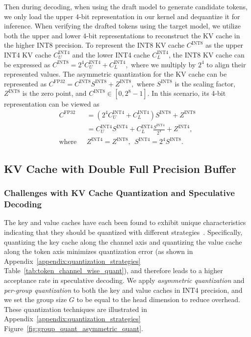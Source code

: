 Then during decoding, when using the draft model to generate candidate tokens, we only load the upper 4-bit representation in our kernel and dequantize it for inference. When verifying the drafted tokens using the target model, we utilize both the upper and lower 4-bit representations to reconstruct the KV cache in the higher INT8 precision. To represent the INT8 KV cache $C^{\text{INT8}}$ as the upper INT4 KV cache $C_{U}^{\text{INT4}}$ and the lower INT4 cache $C_{L}^{\text{INT4}}$, the INT8 KV cache can be expressed as $C^{\text{INT8}} = 2^4 C_{U}^{\text{INT4}} + C_{L}^{\text{INT4}},$ where we multiply by $2^4$ to align their represented values. The asymmetric quantization for the KV cache can be represented as
$C^{\text{FP32}} = C^{\text{INT8}} S^{\text{INT8}} + Z^{\text{INT8}},$
where $S^{\text{INT8}}$ is the scaling factor, $Z^{\text{INT8}}$ is the zero point, and $C^{\text{INT8}} \in [0, 2^8 - 1]$.
In this scenario, its 4-bit representation can be viewed as
\begin{align*}
    C^{\text{FP32}} &= (2^4 C_{U}^{\text{INT4}} + C_{L}^{\text{INT4}}) S^{\text{INT8}} + Z^{\text{INT8}} \\
    &= C_{U}^{\text{INT4}} S^{\text{INT4}} + C_{L}^{\text{INT4}} \frac{S^{\text{INT4}}}{2^4} + Z^{\text{INT4}}, \\
    \text{where~~} & Z^{\text{INT4}} = Z^{\text{INT8}}, ~~S^{\text{INT4}} = 2^4 S^{\text{INT8}}.
\end{align*}



\subsection{KV Cache with Double Full Precision Buffer}\label{subsec:full_precision_buffer}
\subsubsection{Challenges with KV Cache Quantization and Speculative Decoding} 
The key and value caches have each been found to exhibit unique characteristics indicating that they should be quantized with different strategies~\cite{liu2024kivi}. Specifically, quantizing the key cache along the channel axis and quantizing the value cache along the token axis minimizes quantization error (as shown in Appendix~\ref{appendix:quantization_strategies} Table~\ref{tab:token_channel_wise_quant}), and therefore leads to a higher acceptance rate in speculative decoding. We apply \textit{asymmetric quantization} and \textit{per-group quantization} to both the key and value caches in INT4 precision, and we set the group size $G$ to be equal to the head dimension to reduce overhead. These quantization techniques are illustrated in Appendix~\ref{appendix:quantization_strategies} Figure~\ref{fig:group_quant_asymmetric_quant}.


